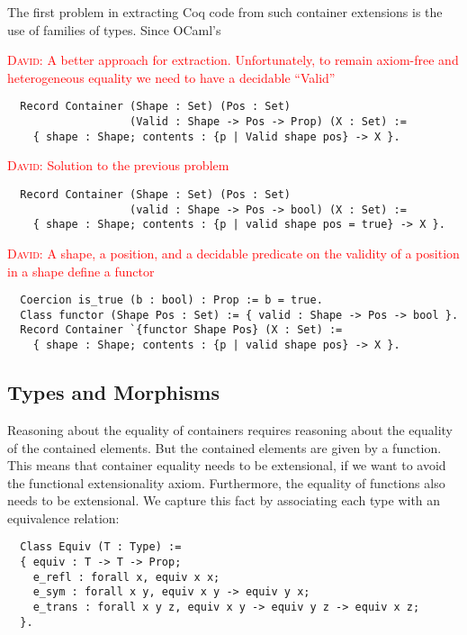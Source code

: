 \documentclass{article}
\newcommand{\dcas}[1]{\textcolor{red}{\textsc{David}: #1}}
\begin{document}
The first problem in extracting Coq code from such container extensions is
the use of families of types. Since OCaml's 

\dcas{A better approach for extraction. Unfortunately, to remain axiom-free and
heterogeneous equality we need to have a decidable ``Valid''}
\begin{verbatim}
  Record Container (Shape : Set) (Pos : Set) 
                   (Valid : Shape -> Pos -> Prop) (X : Set) :=
    { shape : Shape; contents : {p | Valid shape pos} -> X }.
\end{verbatim}

\dcas{Solution to the previous problem}
\begin{verbatim}
  Record Container (Shape : Set) (Pos : Set) 
                   (valid : Shape -> Pos -> bool) (X : Set) :=
    { shape : Shape; contents : {p | valid shape pos = true} -> X }.
\end{verbatim}

\dcas{A shape, a position, and a decidable predicate on the validity of a
position in a shape define a functor}

\begin{verbatim}
  Coercion is_true (b : bool) : Prop := b = true.
  Class functor (Shape Pos : Set) := { valid : Shape -> Pos -> bool }.
  Record Container `{functor Shape Pos} (X : Set) :=
    { shape : Shape; contents : {p | valid shape pos} -> X }.
\end{verbatim}

\subsection{Types and Morphisms}

Reasoning about the equality of containers requires reasoning about the
equality of the contained elements. But the contained elements are given by a
function. This means that container equality needs to be extensional, if we
want to avoid the functional extensionality axiom. Furthermore, the equality of
functions also needs to be extensional. We capture this fact by associating
each type with an equivalence relation:

\begin{verbatim}
  Class Equiv (T : Type) := 
  { equiv : T -> T -> Prop;
    e_refl : forall x, equiv x x;
    e_sym : forall x y, equiv x y -> equiv y x;
    e_trans : forall x y z, equiv x y -> equiv y z -> equiv x z;
  }.
\end{verbatim}
\end{document}
